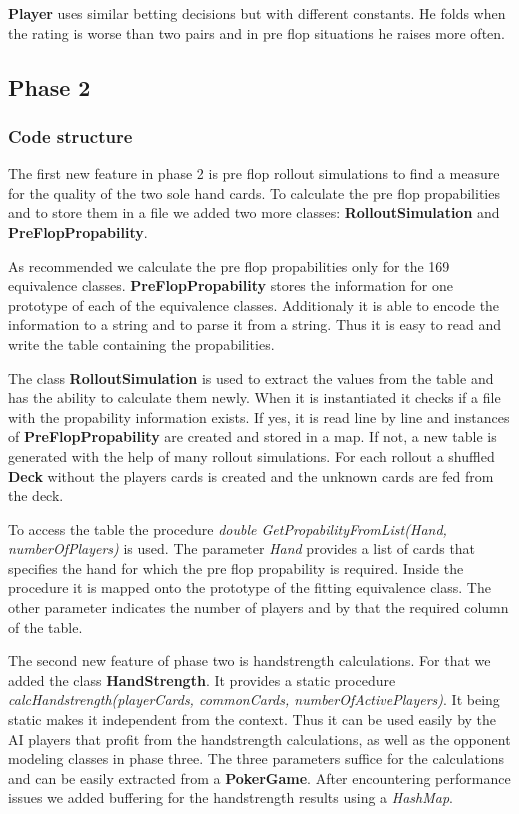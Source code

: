 \textbf{Player} uses similar betting decisions but with different constants. He folds when the rating is worse than two
pairs and in pre flop situations he raises more often.


\subsection{Phase 2}

\subsubsection{Code structure}
The first new feature in phase 2 is pre flop rollout simulations to find a measure for the quality of the two sole hand
cards.
To calculate the pre flop propabilities and to store them in a file we added two more classes: \textbf{RolloutSimulation}
and \textbf{PreFlopPropability}.

As recommended we calculate the pre flop propabilities only for the 169 equivalence
classes. \textbf{PreFlopPropability} stores the information for one prototype of each of the equivalence classes.
Additionaly it is able to encode the information to a string and to parse it from a string. Thus it is easy to read and
write the table containing the propabilities.

The class \textbf{RolloutSimulation} is used to extract the values from the table and has the ability to calculate them
newly. When it is instantiated it checks if a file with the propability information exists. If yes, it is read line by
line and instances of \textbf{PreFlopPropability} are created and stored in a map. If not, a new table is generated 
with the help of many rollout simulations. For each rollout a shuffled \textbf{Deck} without the players cards is
created and the unknown cards are fed from the deck. 

To access the table the procedure \textit{double GetPropabilityFromList(Hand, numberOfPlayers)} is used. The parameter \textit{Hand} provides a list of cards that
specifies the hand for which the pre flop propability is required. Inside the procedure it is mapped onto the prototype
of the fitting equivalence class. The other parameter indicates the number of players and by that the required column of
the table.

The second new feature of phase two is handstrength calculations. For that we added the class \textbf{HandStrength}.
It provides a static procedure \textit{calcHandstrength(playerCards, commonCards, numberOfActivePlayers)}. It being
static makes it independent from the context. Thus it can be used easily by the AI players that profit from the
handstrength calculations, as well as the opponent modeling classes in phase three. The three parameters suffice for the
calculations and can be easily extracted from a \textbf{PokerGame}. After encountering performance issues we added
buffering for the handstrength results using a \textit{HashMap}.

